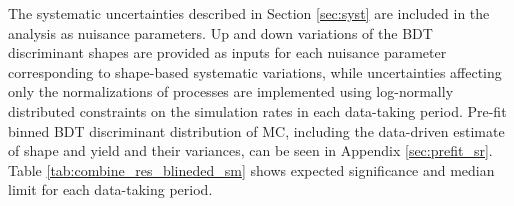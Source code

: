 \documentclass[twoside]{article}
\begin{document}
The systematic uncertainties described in Section \ref{sec:syst} are included in the analysis as nuisance parameters. Up and down variations of the BDT discriminant shapes are provided as inputs for each nuisance parameter corresponding to shape-based systematic variations, while uncertainties affecting only the normalizations of processes are implemented using log-normally distributed constraints on the simulation rates in each data-taking period. Pre-fit binned BDT discriminant distribution of MC, including the data-driven estimate of shape and yield and their variances, can be seen in Appendix \ref{sec:prefit_sr}.\\



Table \ref{tab:combine_res_blineded_sm} shows expected significance and median limit for each data-taking period.\\
\end{document}
